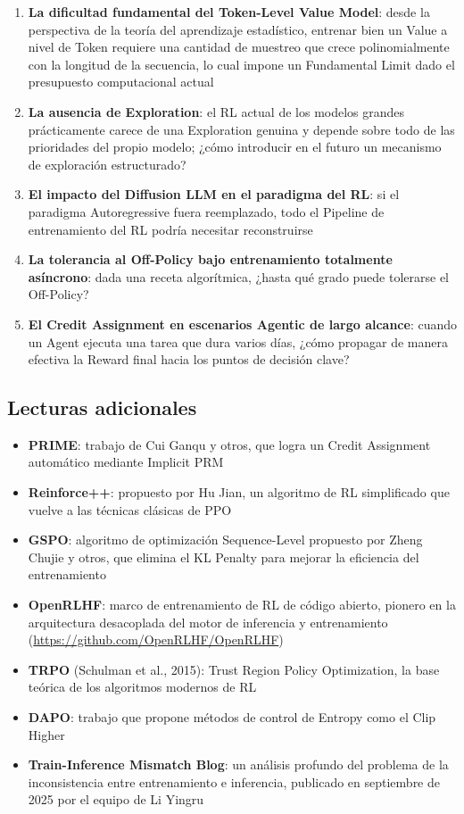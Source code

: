 \documentclass[a4paper]{article}
\begin{document}
\begin{enumerate}
    \item \textbf{La dificultad fundamental del Token-Level Value Model}: desde la perspectiva de la teoría del aprendizaje estadístico, entrenar bien un Value a nivel de Token requiere una cantidad de muestreo que crece polinomialmente con la longitud de la secuencia, lo cual impone un Fundamental Limit dado el presupuesto computacional actual
    \item \textbf{La ausencia de Exploration}: el RL actual de los modelos grandes prácticamente carece de una Exploration genuina y depende sobre todo de las prioridades del propio modelo; ¿cómo introducir en el futuro un mecanismo de exploración estructurado?
    \item \textbf{El impacto del Diffusion LLM en el paradigma del RL}: si el paradigma Autoregressive fuera reemplazado, todo el Pipeline de entrenamiento del RL podría necesitar reconstruirse
    \item \textbf{La tolerancia al Off-Policy bajo entrenamiento totalmente asíncrono}: dada una receta algorítmica, ¿hasta qué grado puede tolerarse el Off-Policy?
    \item \textbf{El Credit Assignment en escenarios Agentic de largo alcance}: cuando un Agent ejecuta una tarea que dura varios días, ¿cómo propagar de manera efectiva la Reward final hacia los puntos de decisión clave?
\end{enumerate}

\subsection{Lecturas adicionales}

\begin{itemize}
    \item \textbf{PRIME}: trabajo de Cui Ganqu y otros, que logra un Credit Assignment automático mediante Implicit PRM
    \item \textbf{Reinforce++}: propuesto por Hu Jian, un algoritmo de RL simplificado que vuelve a las técnicas clásicas de PPO
    \item \textbf{GSPO}: algoritmo de optimización Sequence-Level propuesto por Zheng Chujie y otros, que elimina el KL Penalty para mejorar la eficiencia del entrenamiento
    \item \textbf{OpenRLHF}: marco de entrenamiento de RL de código abierto, pionero en la arquitectura desacoplada del motor de inferencia y entrenamiento (\url{https://github.com/OpenRLHF/OpenRLHF})
    \item \textbf{TRPO} (Schulman et al., 2015): Trust Region Policy Optimization, la base teórica de los algoritmos modernos de RL
    \item \textbf{DAPO}: trabajo que propone métodos de control de Entropy como el Clip Higher
    \item \textbf{Train-Inference Mismatch Blog}: un análisis profundo del problema de la inconsistencia entre entrenamiento e inferencia, publicado en septiembre de 2025 por el equipo de Li Yingru
\end{itemize}

\end{document}
